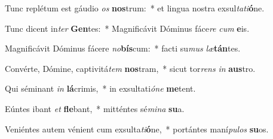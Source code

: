 \item Tunc replétum est gáudio \textit{os} \textbf{nos}trum:~* et lingua nostra exsul\textit{ta}\textit{ti}\textbf{ó}ne.
\item Tunc dicent in\textit{ter} \textbf{Gen}tes:~* Magnificávit Dóminus fáce\textit{re} \textit{cum} \textbf{e}is.
\item Magnificávit Dóminus fácere \textit{no}\textbf{bís}cum:~* facti su\textit{mus} \textit{læ}\textbf{tán}tes.
\item Convérte, Dómine, captivitá\textit{tem} \textbf{nos}tram,~* sicut tor\textit{rens} \textit{in} \textbf{aus}tro.
\item Qui séminant \textit{in} \textbf{lá}crimis,~* in exsultati\textit{ó}\textit{ne} \textbf{me}tent.
\item Eúntes ibant \textit{et} \textbf{fle}bant,~* mitténtes sé\textit{mi}\textit{na} \textbf{su}a.
\item Veniéntes autem vénient cum exsulta\textit{ti}\textbf{ó}ne,~* portántes maní\textit{pu}\textit{los} \textbf{su}os.
